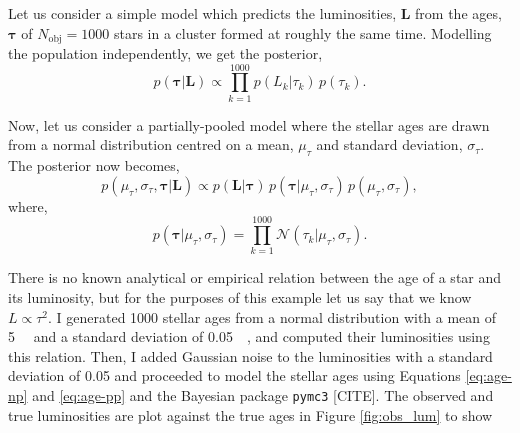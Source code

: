 Let us consider a simple model which predicts the luminosities, $\bm{L}$ from the ages, $\bm{\tau}$ of $N_\mathrm{obj} = 1000$ stars in a cluster formed at roughly the same time. Modelling the population independently, we get the posterior,
%
\begin{equation}
    p(\bm{\tau} | \bm{L}) \propto \prod_{k=1}^{1000} p(L_k | \tau_k) \, p(\tau_k).
    \label{eq:age-np}
\end{equation}
%

Now, let us consider a partially-pooled model where the stellar ages are drawn from a normal distribution centred on a mean, $\mu_\tau$ and standard deviation, $\sigma_\tau$. The posterior now becomes,
%
\begin{equation}
    p(\mu_\tau, \sigma_\tau, \bm{\tau} | \bm{L}) \propto p(\bm{L} | \bm{\tau}) \, p(\bm{\tau} | \mu_\tau, \sigma_\tau) \, p(\mu_\tau, \sigma_\tau),
    \label{eq:age-pp}
\end{equation}
%
where,
%
\begin{equation}
    p(\bm{\tau} | \mu_\tau, \sigma_\tau) = \prod_{k=1}^{1000} \mathcal{N}(\tau_k | \mu_\tau, \sigma_\tau).
\end{equation}

There is no known analytical or empirical relation between the age of a star and its luminosity, but for the purposes of this example let us say that we know $L \propto \tau^{2}$. I generated 1000 stellar ages from a normal distribution with a mean of \SI{5}{\giga\year} and a standard deviation of \SI{0.05}{\giga\year}, and computed their luminosities using this relation. Then, I added Gaussian noise to the luminosities with a standard deviation of \SI{0.05}{\solarluminosity} and proceeded to model the stellar ages using Equations \ref{eq:age-np} and \ref{eq:age-pp} and the Bayesian package \texttt{pymc3} [CITE]. The observed and true luminosities are plot against the true ages in Figure \ref{fig:obs_lum} to show

